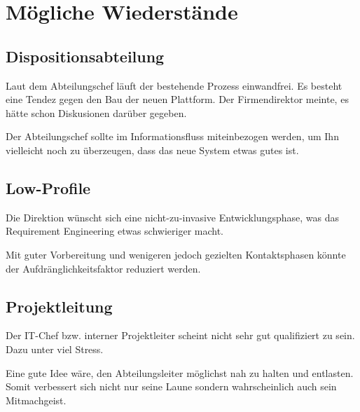 \section{Mögliche Wiederstände}

  \subsection{Dispositionsabteilung}
  Laut dem Abteilungschef läuft der bestehende Prozess einwandfrei. Es besteht eine Tendez gegen den Bau der neuen Plattform.
  Der Firmendirektor meinte, es hätte schon Diskusionen darüber gegeben.
  
  Der Abteilungschef sollte im Informationsfluss miteinbezogen werden, um Ihn vielleicht noch zu überzeugen, dass das neue System etwas gutes ist.
  
  \subsection{Low-Profile}
  Die Direktion wünscht sich eine nicht-zu-invasive Entwicklungsphase, was das Requirement Engineering etwas schwieriger macht.
  
  Mit guter Vorbereitung und wenigeren jedoch gezielten Kontaktsphasen könnte der Aufdränglichkeitsfaktor reduziert werden. 
  
  \subsection{Projektleitung}
  Der IT-Chef bzw. interner Projektleiter scheint nicht sehr gut qualifiziert zu sein. Dazu unter viel Stress.
  
  Eine gute Idee wäre, den Abteilungsleiter möglichst nah zu halten und entlasten.
  Somit verbessert sich nicht nur seine Laune sondern wahrscheinlich auch sein Mitmachgeist. 
